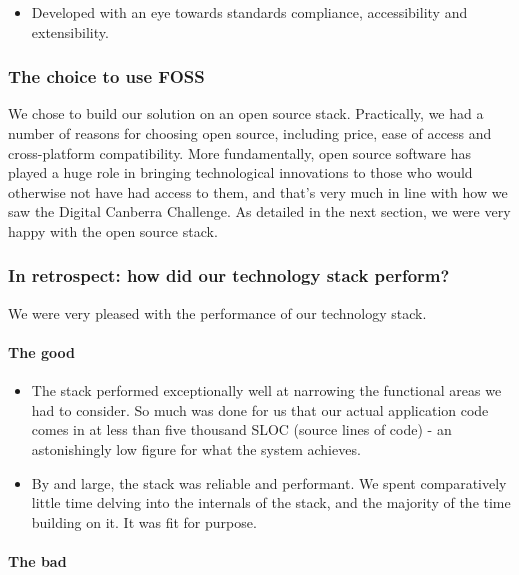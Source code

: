 \documentclass[12pt,a4paper,twosided]{article}
\begin{document}
\begin{itemize}
  \begin{itemize}
  
  \item
    Developed with an eye towards standards compliance, accessibility
    and extensibility.
  \end{itemize}
\end{itemize}

\subsubsection{The choice to use FOSS}

We chose to build our solution on an open source stack. Practically, we
had a number of reasons for choosing open source, including price, ease
of access and cross-platform compatibility. More fundamentally, open
source software has played a huge role in bringing technological
innovations to those who would otherwise not have had access to them,
and that's very much in line with how we saw the Digital Canberra
Challenge. As detailed in the next section, we were very happy with the
open source stack.

\subsubsection{In retrospect: how did our technology stack perform?}

We were very pleased with the performance of our technology stack.

\paragraph{The good}

\begin{itemize}

\item
  The stack performed exceptionally well at narrowing the functional
  areas we had to consider. So much was done for us that our actual
  application code comes in at less than five thousand SLOC (source
  lines of code) - an astonishingly low figure for what the system
  achieves.
\item
  By and large, the stack was reliable and performant. We spent
  comparatively little time delving into the internals of the stack, and
  the majority of the time building on it. It was fit for purpose.
\end{itemize}

\paragraph{The bad}
\end{document}
